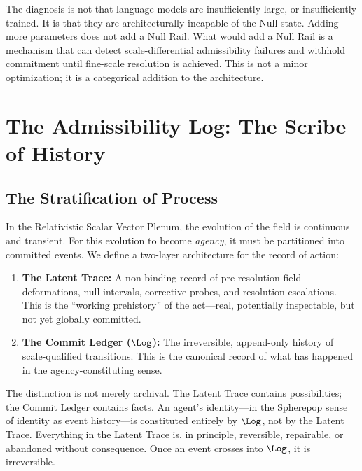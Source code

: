 \documentclass[11pt,oneside]{book}
\begin{document}
The diagnosis is not that language models are insufficiently large, or insufficiently trained. It is that they are architecturally incapable of the Null state. Adding more parameters does not add a Null Rail. What would add a Null Rail is a mechanism that can detect scale-differential admissibility failures and withhold commitment until fine-scale resolution is achieved. This is not a minor optimization; it is a categorical addition to the architecture.

\chapter{The Admissibility Log: The Scribe of History}

\section{The Stratification of Process}

In the Relativistic Scalar Vector Plenum, the evolution of the field is continuous and transient. For this evolution to become \textit{agency}, it must be partitioned into committed events. We define a two-layer architecture for the record of action:

\begin{enumerate}
    \item \textbf{The Latent Trace:} A non-binding record of pre-resolution field deformations, null intervals, corrective probes, and resolution escalations. This is the ``working prehistory'' of the act---real, potentially inspectable, but not yet globally committed.

    \item \textbf{The Commit Ledger ($\Log$):} The irreversible, append-only history of scale-qualified transitions. This is the canonical record of what has happened in the agency-constituting sense.
\end{enumerate}

The distinction is not merely archival. The Latent Trace contains possibilities; the Commit Ledger contains facts. An agent's identity---in the Spherepop sense of identity as event history---is constituted entirely by $\Log$, not by the Latent Trace. Everything in the Latent Trace is, in principle, reversible, repairable, or abandoned without consequence. Once an event crosses into $\Log$, it is irreversible.
\end{document}
